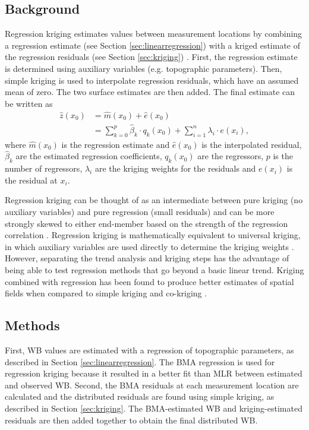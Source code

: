\documentclass{sfuthesis}
\begin{document}
\subsection{Background}

Regression kriging estimates values between measurement locations by combining a regression estimate (see Section \ref{sec:linearregression}) with a kriged estimate of the regression residuals (see Section \ref{sec:kriging}) \citep{Hengl2007}. First, the regression estimate is determined using auxiliary variables (e.g. topographic parameters). Then, simple kriging is used to interpolate regression residuals, which have an assumed mean of zero. The two surface estimates are then added. The final estimate can be written as 
\begin{align}
\hat{z}(x_0) &= \hat{m}(x_0) + \hat{e}(x_0)\\
& = \sum^p_{k=0}\hat{\beta}_k \cdot	q_k(x_0)+ \sum_{i=1}^{n} \lambda_i \cdot e(x_i),
\end{align}
where $\hat{m}(x_0)$ is the regression estimate and $\hat{e}(x_0)$ is the interpolated residual, $\hat{\beta}_k$ are the estimated regression coefficients, $q_k(x_0)$ are the regressors, $p$ is the number of regressors, $\lambda_i$ are the kriging weights for the residuals and $e(x_i)$ is the residual at $x_i$.

Regression kriging can be thought of as an intermediate between pure kriging (no auxiliary variables) and pure regression (small residuals) and can be more strongly skewed to either end-member based on the strength of the regression correlation \citep{Hengl2007}. Regression kriging is mathematically equivalent to universal kriging, in which auxiliary variables are used directly to determine the kriging weights \citep{Hengl2007}. However, separating the trend analysis and kriging steps has the advantage of being able to test regression methods that go beyond a basic linear trend. Kriging combined with regression has been found to produce better estimates of spatial fields when compared to simple kriging and co-kriging \citep{Knotters1995}.

\subsection{Methods}

First, WB values are estimated with a regression of topographic parameters, as described in Section \ref{sec:linearregression}. The BMA regression is used for regression kriging because it resulted in a better fit than MLR between estimated and observed WB. Second, the BMA residuals at each measurement location are calculated and the distributed residuals are found using simple kriging, as described in Section \ref{sec:kriging}. The BMA-estimated  WB and kriging-estimated residuals are then added together to obtain the final distributed WB. 
\end{document}
